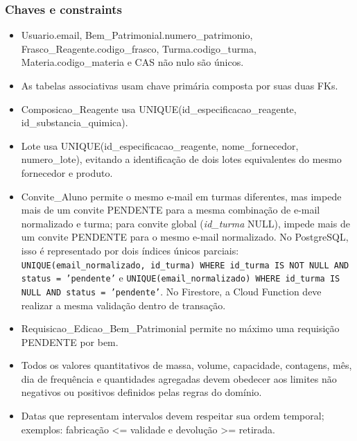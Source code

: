 \subsubsection{Chaves e constraints}
\begin{itemize}
    \item Usuario.email, Bem\_Patrimonial.numero\_patrimonio, Frasco\_Reagente.codigo\_frasco, Turma.codigo\_turma, Materia.codigo\_materia e CAS não nulo são únicos.
    \item As tabelas associativas usam chave primária composta por suas duas FKs.
    \item Composicao\_Reagente usa UNIQUE(id\_especificacao\_reagente, id\_substancia\_quimica).
    \item Lote usa UNIQUE(id\_especificacao\_reagente, nome\_fornecedor, numero\_lote), evitando a identificação de dois lotes equivalentes do mesmo fornecedor e produto.
    \item Convite\_Aluno permite o mesmo e-mail em turmas diferentes, mas impede mais de um convite PENDENTE para a mesma combinação de e-mail normalizado e turma; para convite global (\textit{id\_turma} NULL), impede mais de um convite PENDENTE para o mesmo e-mail normalizado. No PostgreSQL, isso é representado por dois índices únicos parciais: \texttt{UNIQUE(email\_normalizado, id\_turma) WHERE id\_turma IS NOT NULL AND status = 'pendente'} e \texttt{UNIQUE(email\_normalizado) WHERE id\_turma IS NULL AND status = 'pendente'}. No Firestore, a Cloud Function deve realizar a mesma validação dentro de transação.
    \item Requisicao\_Edicao\_Bem\_Patrimonial permite no máximo uma requisição PENDENTE por bem.
    \item Todos os valores quantitativos de massa, volume, capacidade, contagens, mês, dia de frequência e quantidades agregadas devem obedecer aos limites não negativos ou positivos definidos pelas regras do domínio.
    \item Datas que representam intervalos devem respeitar sua ordem temporal; exemplos: fabricação <= validade e devolução >= retirada.
\end{itemize}

